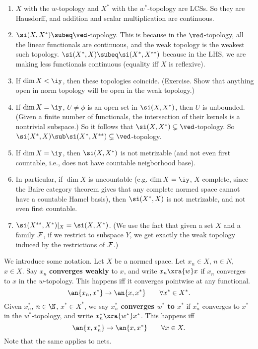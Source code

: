 \begin{pr}
\begin{enumerate}
\item
$X$ with the $w$-topology and $X^*$ with the $w^*$-topology are LCSs. So they are Hausdorff, and addition and scalar multiplication are continuous.
\item
$\si(X,X^*)\subeq \ved$-topology. This is because in the $\ved$-topology, all the linear functionals are continuous, and the weak topology is the weakest such topology.
$\si(X^*,X)\subeq \si(X^*,X^{**})$ because in the LHS, we are making less functionals continuous (equality iff $X$ is reflexive).
\item
If $\dim X<\iy$, then these topologies coincide. (Exercise.
Show that anything open in norm topology will be open in the weak topology.)
\item
If $\dim X=\iy$, $U\ne \phi$ is an open set in $\si(X,X^*)$, then $U$ is unbounded. (Given a finite number of functionals, the intersection of their kernels is a nontrivial subspace.) 
So it follows that $\si(X,X^*)\subsetneq\ved$-topology. So $\si(X^*,X)\sub \si(X^*,X^{**})\subsetneq \ved$-topology. 
\item
If $\dim X=\iy$, then $\si(X,X^*)$ is not metrizable (and not even first countable, i.e., does not have countable neigborhood base). 
\item In particular, if $\dim X$ is uncountable (e.g. $\dim X=\iy$, $X$ complete, since the
Baire category theorem gives that any complete normed space cannot have a countable Hamel basis), then $\si(X^*,X)$ is not metrizable, and not even first countable.
\item $\si(X^{**}, X^*)|_X=\si(X,X^*)$. (We use the fact that given a set $X$ and a family $\cal F$, if we restrict to subspace $Y$, we get exactly the weak topology induced by the restrictions of $\cal F$.)
\end{enumerate}
\end{pr}
We introduce some notation. Let $X$ be a normed space. Let $x_n\in X$, $n\in N$, $x\in X$. Say $x_n$ \textbf{converges weakly} to $x$, and write $x_n\xra{w}x$ if $x_n$ converges to $x$ in the $w$-topology.  This happens iff it converges pointwise at any functional.
\[
\an{x_n,x^*}\to \an{x,x^*}\qquad \forall x^*\in X^*.
\]
Given $x_n^*$, $n\in \N$, $x^*\in X^*$, we say \textbf{$x_n^*$ converges $w^*$ to $x^*$} if $x_n^*$ converges to $x^*$ in the $w^*$-topology, and write $x_n^*\xra{w^*} x^*$. This happens iff 
\[
\an{x,x_n^*}\to \an{x,x^*}\qquad \forall x\in X.
\]
Note that the same applies to nets.

